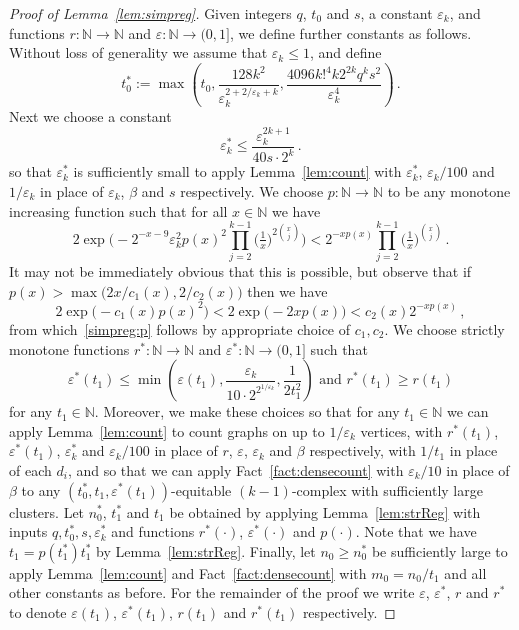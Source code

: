 \documentclass[12pt,a4paper]{amsart}
\let\eps\varepsilon
\newcommand{\NATS}{\mathbb{N}}
\begin{document}
\begin{proof}[Proof of Lemma~\ref{lem:simpreg}]
Given integers $q$, $t_0$ and $s$,
a constant $\eps_k$, and functions $r:\NATS\to\NATS$ and $\eps:\NATS\to(0,1]$, we define
further constants as follows. Without loss of generality we assume that $\eps_k
\leq 1$, and define 
\begin{equation}\label{simpreg:etas}
t_0^*:=\max \left(t_0,
\frac {128k^2}{\eps_k^{2+2/\eps_k+k}},
\frac{4096k!^4k2^{2k}q^ks^2}{\eps_k^{4}}\right)\,.
\end{equation}
Next we choose a constant
\begin{equation}\label{simpreg:epsks}
  \eps_k^* \le
  \frac{\eps_k^{2k+1}}{40s\cdot 2^k}\,.
\end{equation}
so that $\eps_k^*$ is sufficiently small to apply Lemma~\ref{lem:count} with $\eps_k^*$, $\eps_k/100$ and $1/\eps_k$ in place of $\eps_k$, $\beta$ and $s$ respectively.
We choose $p:\NATS\to\NATS$ to be any monotone increasing function such that for
all $x\in\NATS$ we have
\begin{equation}\label{simpreg:p}
  2\exp\Big(-2^{-x-9}\eps_k^2p(x)^2\prod_{j=2}^{k-1}
\big(\tfrac{1}{x}\big)^{2\binom{x}{j}}\Big)<2^{-xp(x)}
\prod_{j=2}^{k-1}\big(\tfrac{1}{x}\big)^{\binom{x}{j}}\,.
\end{equation}
It may not be immediately obvious that this is possible, but observe that if $p(x) > \max\big(2x/c_1(x),2/c_2(x)\big)$ then we have
\[2\exp\big(-c_1(x)p(x)^2\big)<2\exp\big(-2xp(x)\big)<c_2(x)2^{-xp(x)}\,,\]
from which~\eqref{simpreg:p} follows by appropriate choice of $c_1,c_2$.
We choose strictly monotone functions
$r^*:\NATS\to\NATS$ and $\eps^*:\NATS\to(0,1]$ such that 
\begin{equation}\label{simpreg:epssrs}
  \eps^*(t_1) \le \min \left(\eps(t_1), \frac{\eps_k}{10\cdot
2^{2^{1/\eps_k}}}, \frac{1}{2t_1^2} \right)\text{ and }r^*(t_1) \geq
r(t_1)
\end{equation}
for any $t_1 \in \NATS$. Moreover, we make these choices so that for
any $t_1 \in \NATS$ we can apply Lemma~\ref{lem:count} to count graphs on up to $1/\eps_k$ vertices, with 
$r^*(t_1)$, $\eps^*(t_1)$, $\eps_k^*$ and $\eps_k/100$ in place of 
$r$, $\eps$, $\eps_k$ and $\beta$ respectively, with $1/t_1$ in place of each $d_i$, and so that we can apply
Fact~\ref{fact:densecount} with $\eps_k/10$ in place of $\beta$ to any
$(t_0^*,t_1,\eps^*(t_1))$-equitable $(k-1)$-complex with
sufficiently large clusters.
Let $n^*_0$, $t_1^*$ and $t_1$ be obtained by applying
Lemma~\ref{lem:strReg} with inputs $q, t_0^*, s, \eps_k^*$ and functions
$r^*(\cdot)$, $\eps^*(\cdot)$ and $p(\cdot)$. Note that we
have $t_1=p(t_1^*)t_1^*$ by Lemma~\ref{lem:strReg}. Finally, let $n_0 \geq n^*_0$ be sufficiently
large to apply Lemma~\ref{lem:count} and Fact~\ref{fact:densecount} with $m_0 =
n_0/t_1$ and all other constants as before. For the remainder of the proof we
write $\eps$, $\eps^*$, $r$ and $r^*$ to denote $\eps(t_1)$,
$\eps^*(t_1)$, $r(t_1)$ and $r^*(t_1)$ respectively.


\end{proof}
\end{document}
